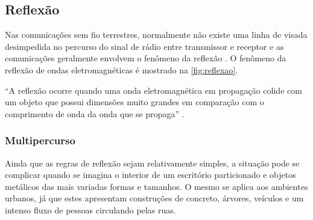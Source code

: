 \subsection{Reflexão}
\label{sub:reflexao}

Nas comunicações sem fio terrestres, normalmente não existe uma linha de visada desimpedida no percurso do sinal de rádio entre transmissor e receptor e as comunicações geralmente envolvem o fenômeno da reflexão \cite{haykin2008}. O fenômeno da reflexão de ondas eletromagnéticas é mostrado na \autoref{fig:reflexao}.

``A reflexão ocorre quando uma onda eletromagnética em propagação colide com um objeto que possui dimensões muito grandes em comparação com o comprimento de onda da onda que se propaga'' \cite[p.~76]{rappaport2009}.

\begin{figure}[H]
	\centering
\end{figure}

\subsubsection{Multipercurso}
\label{subsec:multipercurso}

Ainda que as regras de reflexão sejam relativamente simples, a situação pode se complicar quando se imagina o interior de um escritório particionado e objetos metálicos das mais variadas formas e tamanhos. O mesmo se aplica aos ambientes urbanos, já que estes apresentam construções de concreto, árvores, veículos e um intenso fluxo de pessoas circulando pelas ruas.

